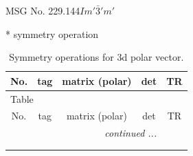 \documentclass[fleqn,8pt]{jsarticle}
\begin{document}
\setcounter{MaxMatrixCols}{32}

\renewcommand{\tablename}{Table~}
\renewcommand{\figurename}{Figure~}
\begin{center}
\LARGE
MSG No. 229.144\quad$Im'\bar{3}'m'$
\end{center}
* symmetry operation
\renewcommand{\arraystretch}{1.3}
\begin{longtable}{ccccc}
\caption{Symmetry operations for 3d polar vector.}
 \\
 \hline \hline
No. & tag & matrix (polar) & det & TR \\ \hline \endfirsthead

\multicolumn{4}{l}{\tablename\ \thetable{}} \\
 \hline \hline
No. & tag & matrix (polar) & det & TR \\ \hline \endhead

 \hline \hline
\multicolumn{4}{r}{\footnotesize\it continued ...} \\ \endfoot

 \hline \hline
\multicolumn{4}{r}{} \\ \endlastfoot


\end{longtable}
\end{document}
